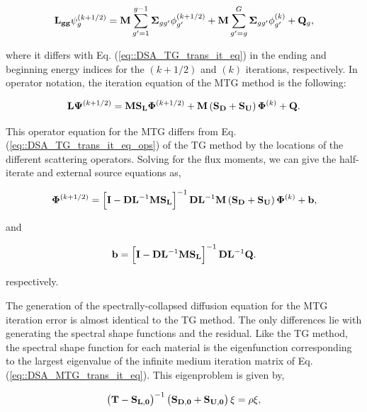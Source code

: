 \begin{equation}
\label{eq::DSA_MTG_trans_it_eq}
{\bf L_{gg}} \psi_g^{(k+1/2)} = {\bf M} \sum_{g'=1}^{g-1} {\bf \Sigma}_{g g'} \phi_{g'}^{(k+1/2)} + {\bf M} \sum_{g'=g}^G {\bf \Sigma}_{g g'} \phi_{g'}^{(k)} + {\bf Q}_g, 
\end{equation}

\noindent where it differs with Eq. (\ref{eq::DSA_TG_trans_it_eq}) in the ending and beginning energy indices for the $(k+1/2)$ and $(k)$ iterations, respectively. In operator notation, the iteration equation of the MTG method is the following:

\begin{equation}
\label{eq::DSA_MTG_trans_it_eq_ops}
{\bf L} {\bf \Psi}^{(k+1/2)} = {\bf M} {\bf S_L} {\bf \Phi}^{(k+1/2)} + {\bf M}\left(  {\bf S_D} + {\bf S_U} \right)  {\bf \Phi}^{(k)} + {\bf Q} .
\end{equation}

\noindent This operator equation for the MTG differs from Eq. (\ref{eq::DSA_TG_trans_it_eq_ops}) of the TG method by the locations of the different scattering operators. Solving for the flux moments, we can give the half-iterate and external source equations as,

\begin{equation}
\label{eq::DSA_MTG_half_it_sol}
{\bf \Phi}^{(k+1/2)} = \left[ {\bf I} - {\bf D}{\bf L}^{-1} {\bf M}{\bf S_L}\right]^{-1} {\bf D}{\bf L}^{-1}  {\bf M} \left(  {\bf S_D} + {\bf S_U} \right) {\bf \Phi}^{(k)} + {\bf b} ,
\end{equation}

\noindent and

\begin{equation}
\label{eq::DSA_MTG_half_it_forcingfunc}
{\bf b} = \left[ {\bf I} - {\bf D}{\bf L}^{-1} {\bf M} {\bf S_L} \right]^{-1} {\bf D}{\bf L}^{-1}  {\bf Q} .
\end{equation}

\noindent respectively. 

The generation of the spectrally-collapsed diffusion equation for the MTG iteration error is almost identical to the TG method. The only differences lie with generating the spectral shape functions and the residual. Like the TG method, the spectral shape function for each material is the eigenfunction corresponding to the largest eigenvalue of the infinite medium iteration matrix of Eq. (\ref{eq::DSA_MTG_trans_it_eq}). This eigenproblem is given by,

\begin{equation}
\label{eq::DSA_MTG_eigenpprob}
\left(  {\bf T} - {\bf S_{L,0}}  \right)^{-1} \left( {\bf S_{D,0}}+ {\bf S_{U,0}} \right)\xi = \rho \xi ,
\end{equation}

